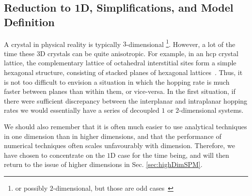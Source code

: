 \subsection{Reduction to 1D, Simplifications, and Model Definition}
\label{sec:modelDefn}
A crystal in physical reality is typically $3$-dimensional 
\footnote{or possibly $2$-dimensional, but those
are odd cases~\cite{allen2009}}.
However, a lot of the time these $3$D crystals can be quite anisotropic. For example, in
an hcp crystal lattice, the complementary lattice of octahedral interstitial sites form a simple hexagonal
structure, consisting of stacked planes of hexagonal lattices~\cite{Li2018}. Thus, it is not too difficult to envision
a situation in which the hopping rate is much faster between planes than within them, or vice-versa. In the
first situation, if there were sufficient discrepancy between the interplanar and intraplanar hopping rates
we would essentially have a series of decoupled $1$ or $2$-dimensional systems.

We should also remember that it is often much easier to use analytical techniques in one dimension than
in higher dimensions, and that the performance of numerical techniques often scales unfavourably 
with dimension. Therefore, we have chosen to concentrate on the $1$D case for the time being, and will then
return to the issue of higher dimensions in Sec. \ref{sec:highDimSPM}.

